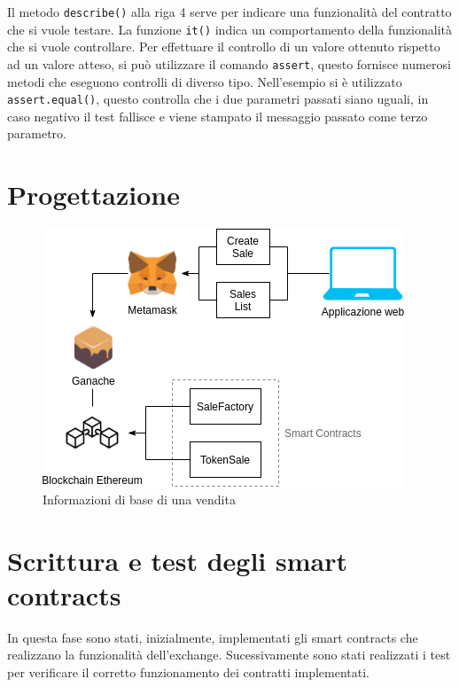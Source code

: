 \documentclass[a4paper]{article}
\begin{document}
        Il metodo \verb|describe()| alla riga 4 serve per indicare una funzionalità del contratto che si vuole testare.
        La funzione \verb|it()| indica un comportamento della funzionalità che si vuole controllare.
        \newline
        Per effettuare il controllo di un valore ottenuto rispetto ad un valore atteso, si può utilizzare il comando \verb|assert|, questo fornisce numerosi metodi che eseguono controlli di diverso tipo.
        Nell'esempio si è utilizzato \verb|assert.equal()|, questo controlla che i due parametri passati siano uguali, in caso negativo il test fallisce e viene stampato il messaggio passato come terzo parametro.
        \newpage

        \section{Progettazione}
        \begin{figure}[H]
          \includegraphics[width=\textwidth, fbox]{structure.png}
          \centering
          \caption{Informazioni di base di una vendita}
          \centering
          \label{fig:structure}
        \end{figure}

        \section{Scrittura e test degli smart contracts}
        In questa fase sono stati, inizialmente, implementati gli smart contracts che realizzano la funzionalità dell'exchange. Sucessivamente sono stati realizzati i test per verificare il corretto funzionamento dei contratti implementati.
\end{document}
